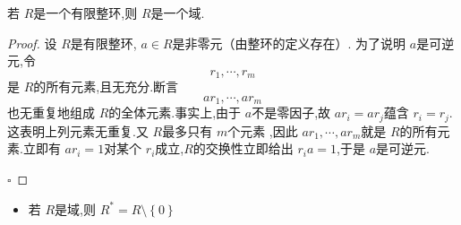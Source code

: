 \documentclass[lang=cn,12pt,color=green,fontset=none,pad]{elegantbook}
\begin{document}
\begin{proposition}\label{pro:finite-int-domain-to-filde}
    若 \(  R  \)是一个有限整环,则 \(  R  \)是一个域.  
\end{proposition}

\begin{proof}
    设 \(  R  \)是有限整环, \(  a \in R  \)是非零元（由整环的定义存在）. 
    为了说明 \(  a  \)是可逆元,令 \[
     r_1,\cdots,r_m 
    \]是 \(  R  \)的所有元素,且无充分.断言 \[
    ar_1,\cdots ,ar_{m}
    \] 也无重复地组成 \(  R  \)的全体元素.事实上,由于 \(  a  \)不是零因子,故 \(  ar_i= ar_{j}  \)蕴含 \(  r_{i}= r_{j}  \). 这表明上列元素无重复.又 \(  R  \)最多只有 \(  m  \)个元素
    ,因此 \(  ar_1,\cdots ,ar_{m}  \)就是 \(  R  \)的所有元素.立即有 \(  ar_{i}= 1  \)对某个 \(  r_{i}  \)成立,\(  R  \)的交换性立即给出 \(  r_{i}a =  1  \),于是 \(  a  \)是可逆元.         

    \hfill $\square$
\end{proof}


\begin{remark}
    \begin{itemize}
        \item 若 \(  R  \)是域,则 \(  R^{*}=  R\setminus \left\{ 0 \right\}  \)  
    \end{itemize}
    
\end{remark}
\end{document}
